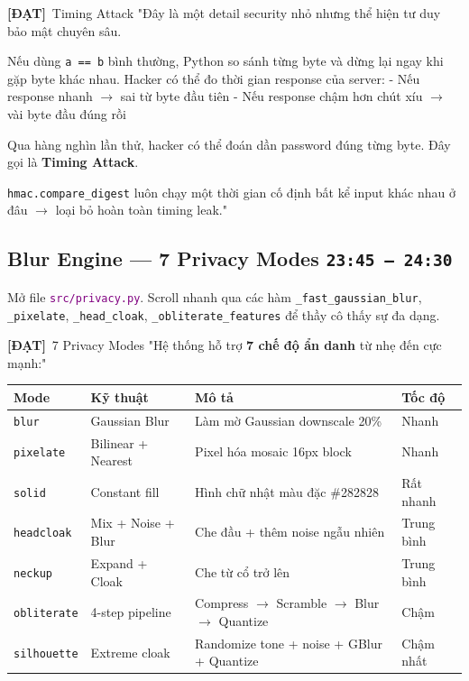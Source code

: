 \documentclass[12pt, a4paper]{article}
\newcommand{\timing}[1]{%
  \hfill\colorbox{NavyBlue!20}{\texttt{\small #1}}%
}
\newcommand{\dat}{\textcolor{BrickRed}{\textbf{[ĐẠT]}}}
\newcommand{\fpath}[1]{\texttt{\textcolor{purple}{#1}}}
\begin{document}
\begin{dialog}{\dat\ Timing Attack}
"Đây là một detail security nhỏ nhưng thể hiện tư duy bảo mật chuyên sâu.

Nếu dùng \texttt{a == b} bình thường, Python so sánh từng byte
và dừng lại ngay khi gặp byte khác nhau.
Hacker có thể đo thời gian response của server:
- Nếu response nhanh $\rightarrow$ sai từ byte đầu tiên
- Nếu response chậm hơn chút xíu $\rightarrow$ vài byte đầu đúng rồi

Qua hàng nghìn lần thử, hacker có thể đoán dần password đúng từng byte.
Đây gọi là \textbf{Timing Attack}.

\texttt{hmac.compare\_digest} luôn chạy một thời gian cố định
bất kể input khác nhau ở đâu $\rightarrow$ loại bỏ hoàn toàn timing leak."
\end{dialog}

\subsection{Blur Engine --- 7 Privacy Modes \timing{23:45 – 24:30}}

\begin{action}
Mở file \fpath{src/privacy.py}. Scroll nhanh qua
các hàm \texttt{\_fast\_gaussian\_blur}, \texttt{\_pixelate}, \texttt{\_head\_cloak},
\texttt{\_obliterate\_features} để thầy cô thấy sự đa dạng.
\end{action}

\begin{dialog}{\dat\ 7 Privacy Modes}
"Hệ thống hỗ trợ \textbf{7 chế độ ẩn danh}
từ nhẹ đến cực mạnh:"
\end{dialog}

\begin{tcolorbox}[colback=gray!5, colframe=NavyBlue!60, title=\textbf{7 Privacy Modes}]
\renewcommand{\arraystretch}{1.5}
\begin{tabularx}{\textwidth}{llXl}
\toprule
\textbf{Mode} & \textbf{Kỹ thuật} & \textbf{Mô tả} & \textbf{Tốc độ} \\
\midrule
\texttt{blur} & Gaussian Blur & Làm mờ Gaussian downscale 20\% & Nhanh \\
\texttt{pixelate} & Bilinear + Nearest & Pixel hóa mosaic 16px block & Nhanh \\
\texttt{solid} & Constant fill & Hình chữ nhật màu đặc \#282828 & Rất nhanh \\
\texttt{headcloak} & Mix + Noise + Blur & Che đầu + thêm noise ngẫu nhiên & Trung bình \\
\texttt{neckup} & Expand + Cloak & Che từ cổ trở lên & Trung bình \\
\texttt{obliterate} & 4-step pipeline & Compress $\rightarrow$ Scramble $\rightarrow$ Blur $\rightarrow$ Quantize & Chậm \\
\texttt{silhouette} & Extreme cloak & Randomize tone + noise + GBlur + Quantize & Chậm nhất \\
\bottomrule
\end{tabularx}
\end{tcolorbox}
\end{document}
